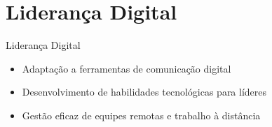 \documentclass[aspectratio=169,xcolor=dvipsnames]{beamer}
\begin{document}
\section{Liderança Digital}

\begin{frame}{Liderança Digital}
	\begin{itemize}
		\item Adaptação a ferramentas de comunicação digital
		\item Desenvolvimento de habilidades tecnológicas para líderes
		\item Gestão eficaz de equipes remotas e trabalho à distância

	\end{itemize}
\end{frame}


\end{document}
